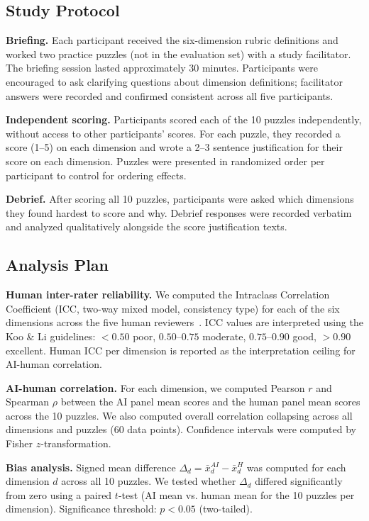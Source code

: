 \subsection{Study Protocol}

\textbf{Briefing.} Each participant received the six-dimension rubric definitions and worked two practice puzzles (not in the evaluation set) with a study facilitator. The briefing session lasted approximately 30 minutes. Participants were encouraged to ask clarifying questions about dimension definitions; facilitator answers were recorded and confirmed consistent across all five participants.

\textbf{Independent scoring.} Participants scored each of the 10 puzzles independently, without access to other participants' scores. For each puzzle, they recorded a score (1--5) on each dimension and wrote a 2--3 sentence justification for their score on each dimension. Puzzles were presented in randomized order per participant to control for ordering effects.

\textbf{Debrief.} After scoring all 10 puzzles, participants were asked which dimensions they found hardest to score and why. Debrief responses were recorded verbatim and analyzed qualitatively alongside the score justification texts.

\subsection{Analysis Plan}

\textbf{Human inter-rater reliability.} We computed the Intraclass Correlation Coefficient (ICC, two-way mixed model, consistency type) for each of the six dimensions across the five human reviewers~\cite{koo2016guideline}. ICC values are interpreted using the Koo \& Li guidelines: $< 0.50$ poor, $0.50$--$0.75$ moderate, $0.75$--$0.90$ good, $> 0.90$ excellent. Human ICC per dimension is reported as the interpretation ceiling for AI-human correlation.

\textbf{AI-human correlation.} For each dimension, we computed Pearson $r$ and Spearman $\rho$ between the AI panel mean scores and the human panel mean scores across the 10 puzzles. We also computed overall correlation collapsing across all dimensions and puzzles ($60$ data points). Confidence intervals were computed by Fisher $z$-transformation.

\textbf{Bias analysis.} Signed mean difference $\Delta_d = \bar{x}^{AI}_d - \bar{x}^{H}_d$ was computed for each dimension $d$ across all 10 puzzles. We tested whether $\Delta_d$ differed significantly from zero using a paired $t$-test (AI mean vs. human mean for the 10 puzzles per dimension). Significance threshold: $p < 0.05$ (two-tailed).

